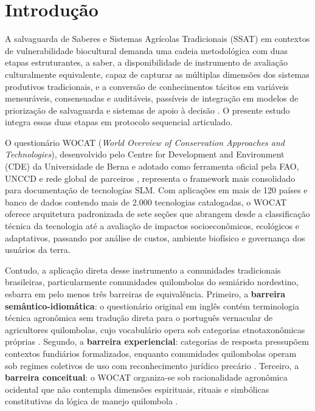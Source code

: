 \newpage

\section{Introdução}

A salvaguarda de Saberes e Sistemas Agrícolas Tradicionais (SSAT) em contextos de vulnerabilidade biocultural demanda uma cadeia metodológica com duas etapas estruturantes, a saber, a disponibilidade de instrumento de avaliação culturalmente equivalente, capaz de capturar as múltiplas dimensões dos sistemas produtivos tradicionais, e a conversão de conhecimentos tácitos em variáveis mensuráveis, consensuadas e auditáveis, passíveis de integração em modelos de priorização de salvaguarda e sistemas de apoio à decisão \cite{Nonaka1995,CohenLevinthal1990}. O presente estudo integra essas duas etapas em protocolo sequencial articulado.

O questionário WOCAT (\textit{World Overview of Conservation Approaches and Technologies}), desenvolvido pelo Centre for Development and Environment (CDE) da Universidade de Berna e adotado como ferramenta oficial pela FAO, UNCCD e rede global de parceiros \cite{Liniger2019,Schwilch2011}, representa o framework mais consolidado para documentação de tecnologias SLM. Com aplicações em mais de 120 países e banco de dados contendo mais de 2.000 tecnologias catalogadas, o WOCAT oferece arquitetura padronizada de sete seções que abrangem desde a classificação técnica da tecnologia até a avaliação de impactos socioeconômicos, ecológicos e adaptativos, passando por análise de custos, ambiente biofísico e governança dos usuários da terra.

Contudo, a aplicação direta desse instrumento a comunidades tradicionais brasileiras, particularmente comunidades quilombolas do semiárido nordestino, esbarra em pelo menos três barreiras de equivalência. Primeiro, a \textbf{barreira semântico-idiomática}: o questionário original em inglês contém terminologia técnica agronômica sem tradução direta para o português vernacular de agricultores quilombolas, cujo vocabulário opera sob categorias etnotaxonômicas próprias \cite{Rist2006,Quave2014}. Segundo, a \textbf{barreira experiencial}: categorias de resposta pressupõem contextos fundiários formalizados, enquanto comunidades quilombolas operam sob regimes coletivos de uso com reconhecimento jurídico precário \cite{Almeida2011}. Terceiro, a \textbf{barreira conceitual}: o WOCAT organiza-se sob racionalidade agronômica ocidental que não contempla dimensões espirituais, rituais e simbólicas constitutivas da lógica de manejo quilombola \cite{Santos2007,Toledo2008}.


